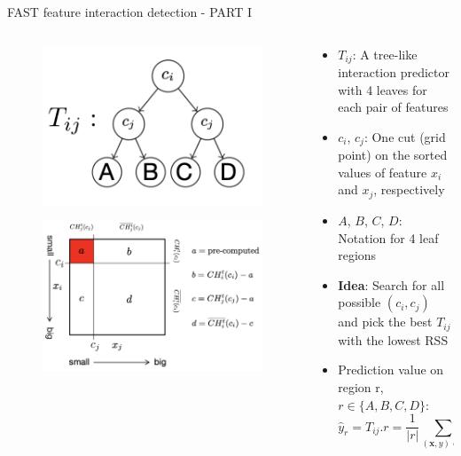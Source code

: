 \documentclass[11pt,compress,t,notes=noshow, aspectratio=169, xcolor=table]{beamer}
\begin{document}
\begin{frame}{FAST feature interaction detection - PART I}

\begin{columns}[T, totalwidth=\textwidth]
\begin{column}{0.5\textwidth}
\begin{figure}
    \centering
    \includegraphics[width=0.6\linewidth]
    {slides//02_interpretable-models//figure/T_ij.png}
    \label{fig:tree-like predictor1}
\end{figure}
\begin{figure}
    \centering
    \includegraphics[width=\linewidth]
    {slides//02_interpretable-models//figure/FAST.png}
    \label{fig:FAST1}
\end{figure}
\end{column}
\hfill
\centering
\begin{column}{0.5\textwidth}
\begin{itemize}
    \item $T_{ij}$: A tree-like interaction predictor with 4 leaves for each pair of features
    \item $c_i$, $c_j$: One cut (grid point) on the sorted values of feature $x_i$ and $x_j$, respectively
    \item $A$, $B$, $C$, $D$: Notation for 4 leaf regions
    \item \textbf{Idea}: Search for all possible $(c_i, c_j)$ and pick the best $T_{ij}$ with the lowest RSS
    \item Prediction value on region r, $r\in\{A, B, C, D\}$:
    $$\hat{y}_r=T_{ij}.r=\frac{1}{\vert r\vert}\sum_{(\mathbf{x},y)\in r}y$$
\end{itemize}
\end{column}
\end{columns}


\end{frame}
\end{document}
